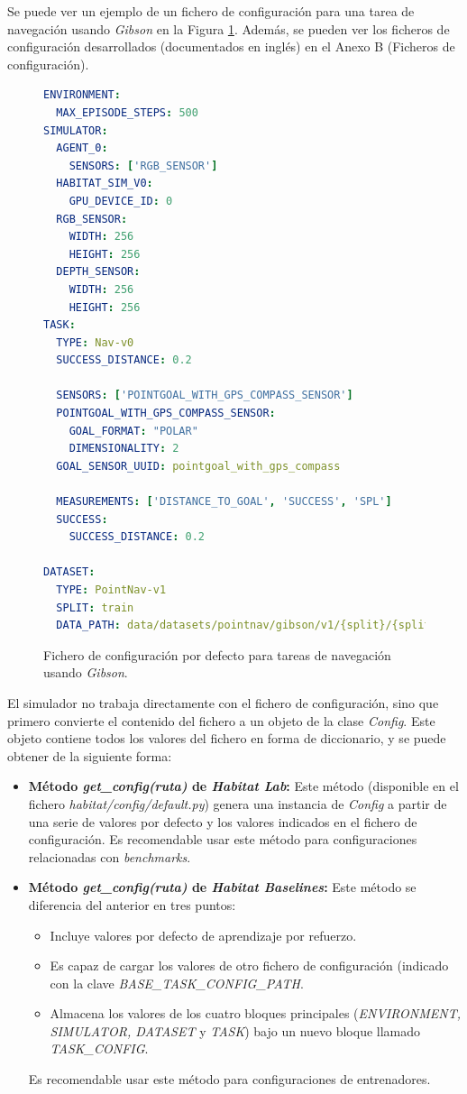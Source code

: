 Se puede ver un ejemplo de un fichero de configuración para una tarea de navegación usando \textit{Gibson} en la Figura \ref{fig:chap4-conf}. Además, se pueden ver los ficheros de configuración desarrollados (documentados en inglés) en el Anexo B (Ficheros de configuración).

\begin{figure}[!ht]
\centering
\begin{lstlisting}[language=yaml]
ENVIRONMENT:
  MAX_EPISODE_STEPS: 500
SIMULATOR:
  AGENT_0:
    SENSORS: ['RGB_SENSOR']
  HABITAT_SIM_V0:
    GPU_DEVICE_ID: 0
  RGB_SENSOR:
    WIDTH: 256
    HEIGHT: 256
  DEPTH_SENSOR:
    WIDTH: 256
    HEIGHT: 256
TASK:
  TYPE: Nav-v0
  SUCCESS_DISTANCE: 0.2

  SENSORS: ['POINTGOAL_WITH_GPS_COMPASS_SENSOR']
  POINTGOAL_WITH_GPS_COMPASS_SENSOR:
    GOAL_FORMAT: "POLAR"
    DIMENSIONALITY: 2
  GOAL_SENSOR_UUID: pointgoal_with_gps_compass

  MEASUREMENTS: ['DISTANCE_TO_GOAL', 'SUCCESS', 'SPL']
  SUCCESS:
    SUCCESS_DISTANCE: 0.2

DATASET:
  TYPE: PointNav-v1
  SPLIT: train
  DATA_PATH: data/datasets/pointnav/gibson/v1/{split}/{split}.json.gz
\end{lstlisting}
\caption{Fichero de configuración por defecto para tareas de navegación usando \textit{Gibson}.}
\label{fig:chap4-conf}
\end{figure}

El simulador no trabaja directamente con el fichero de configuración, sino que primero convierte el contenido del fichero a un objeto de la clase \textit{Config}. Este objeto contiene todos los valores del fichero en forma de diccionario, y se puede obtener de la siguiente forma:

\begin{itemize}
	\item \textbf{Método \textit{get{\_}config(ruta)} de \textit{Habitat Lab}:} Este método (disponible en el fichero \textit{habitat/config/default.py}) genera una instancia de \textit{Config} a partir de una serie de valores por defecto y los valores indicados en el fichero de configuración. Es recomendable usar este método para configuraciones relacionadas con \textit{benchmarks}.
	\item \textbf{Método \textit{get{\_}config(ruta)} de \textit{Habitat Baselines}:} Este método se diferencia del anterior en tres puntos:
	\begin{itemize}
		\item Incluye valores por defecto de aprendizaje por refuerzo.
		\item Es capaz de cargar los valores de otro fichero de configuración (indicado con la clave \textit{BASE{\_}TASK{\_}CONFIG{\_}PATH}.
		\item Almacena los valores de los cuatro bloques principales (\textit{ENVIRONMENT, SIMULATOR, DATASET} y \textit{TASK}) bajo un nuevo bloque llamado \textit{TASK{\_}CONFIG}.
	\end{itemize}	 
	Es recomendable usar este método para configuraciones de entrenadores.
\end{itemize}

